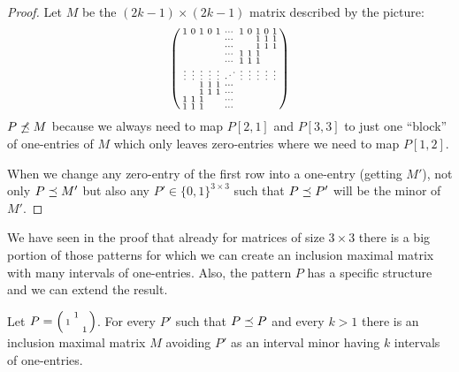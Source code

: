 \begin{proof} Let $M$ be the $(2k-1)\times(2k-1)$ matrix described by the picture:
$$\left(\begin{smallmatrix}	1&0&1&0&1&\cdots&1&0&1&0&1\\
		 & & & & &\cdots& & &1&1&1\\
		 & & & & &\cdots& & &1&1&1\\
		 & & & & &\cdots&1&1&1& & \\
		 & & & & &\cdots&1&1&1& & \\
		\vdots&\vdots&\vdots&\vdots&\vdots&\iddots&\vdots&\vdots&\vdots&\vdots&\vdots\\
		 & &1&1&1&\cdots& & & & & \\
		 & &1&1&1&\cdots& & & & & \\
		1&1&1& & &\cdots& & & & & \\
		1&1&1& & &\cdots& & & & & \\
		 \end{smallmatrix}\right)$$
$P\not\preceq M$ because we always need to map $P[2,1]$ and $P[3,3]$ to just one ``block'' of one-entries of $M$ which only leaves zero-entries where we need to map $P[1,2]$.

When we change any zero-entry of the first row into a one-entry (getting $M'$), not only $P\preceq M'$ but also any $P'\in\{0,1\}^{3\times3}$ such that $P\preceq P'$ will be the minor of $M'$.
\end{proof}
We have seen in the proof that already for matrices of size $3\times3$ there is a big portion of those patterns for which we can create an inclusion maximal matrix with many intervals of one-entries. Also, the pattern $P$ has a specific structure and we can extend the result.
\begin{thm}
Let $P=\left(\begin{smallmatrix} &1& \\1& & \\ & &1\end{smallmatrix}\right)$. For every $P'$ such that $P\preceq P$ and every $k>1$ there is an inclusion maximal matrix $M$ avoiding $P'$ as an interval minor having $k$ intervals of one-entries.
\end{thm}
